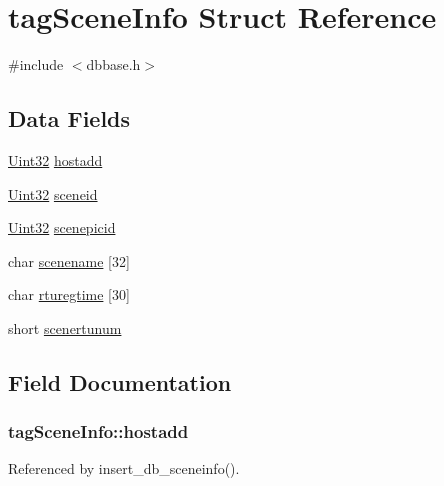 \hypertarget{structtagSceneInfo}{\section{tag\-Scene\-Info Struct Reference}
\label{structtagSceneInfo}
}


{\ttfamily \#include $<$dbbase.\-h$>$}

\subsection*{Data Fields}
\begin{DoxyCompactItemize}
\item 
\hyperlink{base_8h_a60cf7b3c038ce37a50796e8eaddf0b5f}{Uint32} \hyperlink{structtagSceneInfo_aa2f3dcae9fe1a2b7adaa76eb21483958}{hostadd}
\item 
\hyperlink{base_8h_a60cf7b3c038ce37a50796e8eaddf0b5f}{Uint32} \hyperlink{structtagSceneInfo_adb1a89565386eb72b294159e322a1b89}{sceneid}
\item 
\hyperlink{base_8h_a60cf7b3c038ce37a50796e8eaddf0b5f}{Uint32} \hyperlink{structtagSceneInfo_a9ef586d7295c6cdfaf7eb95a6fdb4f2d}{scenepicid}
\item 
char \hyperlink{structtagSceneInfo_a62bc464e8f97b44c40564646cd682bee}{scenename} \mbox{[}32\mbox{]}
\item 
char \hyperlink{structtagSceneInfo_a9cd871ca34fcbccd5529e7df362b6791}{rturegtime} \mbox{[}30\mbox{]}
\item 
short \hyperlink{structtagSceneInfo_ab581a1c2ce38dbba5cbf0fa34364d67b}{scenertunum}
\end{DoxyCompactItemize}


\subsection{Field Documentation}
\hypertarget{structtagSceneInfo_aa2f3dcae9fe1a2b7adaa76eb21483958}{
\subsubsection[{hostadd}]{ tag\-Scene\-Info\-::hostadd}}\label{structtagSceneInfo_aa2f3dcae9fe1a2b7adaa76eb21483958}


Referenced by insert\-\_\-db\-\_\-sceneinfo().

